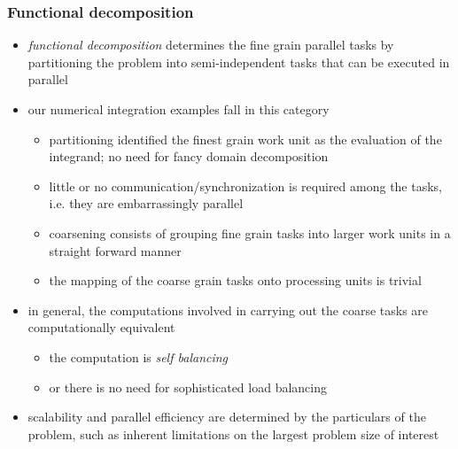 %
%


\begin{frame}[fragile]
%
  \frametitle{Functional decomposition}
%
  \begin{itemize}
%
  \item {\em functional decomposition} determines the fine grain parallel tasks by partitioning
    the problem into semi-independent tasks that can be executed in parallel
%
  \item our numerical integration examples fall in this category
    \begin{itemize}
    \item partitioning identified the finest grain work unit as the evaluation of the
      integrand; no need for fancy domain decomposition
    \item little or no communication/synchronization is required among the tasks, i.e. they are
      embarrassingly parallel
    \item coarsening consists of grouping fine grain tasks into larger work units in a straight
      forward manner
    \item the mapping of the coarse grain tasks onto processing units is trivial
    \end{itemize}
%
  \item in general, the computations involved in carrying out the coarse tasks are
    computationally equivalent
    \begin{itemize}
    \item the computation is {\em self balancing}
    \item or there is no need for sophisticated load balancing
    \end{itemize}
%
  \item scalability and parallel efficiency are determined by the particulars of the problem,
    such as inherent limitations on the largest problem size of interest
%
  \end{itemize}
%
\end{frame}

